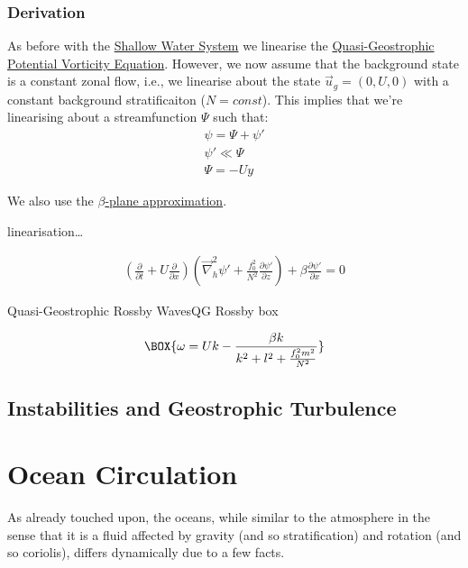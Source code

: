 \subsection{Derivation}

As before with the \hyperref[Shallow Water System]{Shallow Water System} we linearise the \hyperref[QGPV]{Quasi-Geostrophic Potential Vorticity Equation}. However, we now assume that the background state is a constant zonal flow, i.e., we linearise about the state $\vec{u}_g=(0,U,0)$ with a constant background stratificaiton ($N=const$). This implies that we're linearising about a streamfunction $\Psi$ such that:
\begin{align*}
    \psi = \Psi + \psi'
    \\
    \psi' \ll \Psi
    \\
    \Psi = -Uy
\end{align*}

We also use the \hyperref[beta plane box]{$\beta$-plane approximation}.

linearisation\dots

\begin{align*}
    \left( \frac{\partial }{\partial t}+U\frac{\partial }{\partial x} \right)
    \left( 
        \vec{\nabla}_h^2 \psi' 
        +\frac{f_0^2}{N^2}\frac{\partial \psi'}{\partial z}
     \right)
    +
    \beta \frac{\partial \psi' }{\partial x}
    =
    0
\end{align*}

\begin{fact}{Quasi-Geostrophic Rossby Waves}{QG Rossby box}\label{QG Rossby box}

    \begin{gather}
        \BOX{
            \omega = Uk - \frac{\beta k}{k^2 + l^2 +\frac{f_0^2 m^2}{N^2}}
        }
    \end{gather}
\end{fact}

\section{Instabilities and Geostrophic Turbulence}

\chapter{Ocean Circulation}\label{Oceans}

As already touched upon, the oceans, while similar to the atmosphere in the sense that it is a fluid affected by gravity (and so stratification) and rotation (and so coriolis), differs dynamically due to a few facts.

